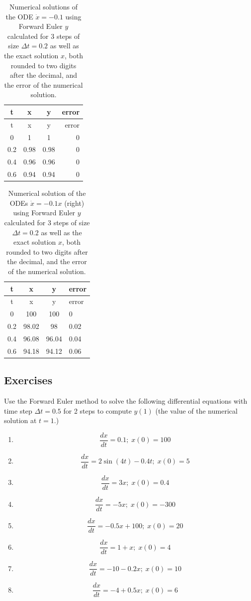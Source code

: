 \documentclass[
  letterpaper,
  DIV=11,
  numbers=noendperiod]{scrreprt}
\begin{document}
\begin{longtable}[]{@{}cccr@{}}
\caption{Numerical solutions of the ODE \(\dot x = -0.1\) using Forward
Euler \(y\) calculated for 3 steps of size \(\Delta t = 0.2\) as well as
the exact solution \(x\), both rounded to two digits after the decimal,
and the error of the numerical solution.}\tabularnewline
\toprule()
t & x & y & error \\
\midrule()
\endfirsthead
\toprule()
t & x & y & error \\
\midrule()
\endhead
0 & 1 & 1 & 0 \\
0.2 & 0.98 & 0.98 & 0 \\
0.4 & 0.96 & 0.96 & 0 \\
0.6 & 0.94 & 0.94 & 0 \\
\bottomrule()
\end{longtable}

\begin{longtable}[]{@{}cccl@{}}
\caption{Numerical solution of the ODEs \(\dot x = -0.1x\) (right) using
Forward Euler \(y\) calculated for 3 steps of size \(\Delta t = 0.2\) as
well as the exact solution \(x\), both rounded to two digits after the
decimal, and the error of the numerical solution.}\tabularnewline
\toprule()
t & x & y & error \\
\midrule()
\endfirsthead
\toprule()
t & x & y & error \\
\midrule()
\endhead
0 & 100 & 100 & 0 \\
0.2 & 98.02 & 98 & 0.02 \\
0.4 & 96.08 & 96.04 & 0.04 \\
0.6 & 94.18 & 94.12 & 0.06 \\
\bottomrule()
\end{longtable}

\label{tab:ch15_FE}

\hypertarget{exercises-24}{%
\subsection{Exercises}\label{exercises-24}}

Use the Forward Euler method to solve the following differential
equations with time step \(\Delta t=0.5\) for 2 steps to compute
\(y(1)\) (the value of the numerical solution at \(t=1\).)

\begin{enumerate}
\def\labelenumi{\arabic{enumi}.}
\item
  \[ \frac{dx}{dt} = 0.1; \; x(0)= 100 \]
\item
  \[ \frac{dx}{dt} =  2\sin(4t) -0.4t; \; x(0)= 5 \]
\item
  \[ \frac{dx}{dt} = 3x; \; x(0) = 0.4 \]
\item
  \[ \frac{dx}{dt} = -5x; \;  x(0) = -300 \]
\item
  \[ \frac{dx}{dt} = -0.5x + 100 ; \; x(0) = 20 \]
\item
  \[ \frac{dx}{dt} =  1 + x; \; x(0) = 4 \]
\item
  \[ \frac{dx}{dt} =  -10 - 0.2x; \; x(0) = 10 \]
\item
  \[ \frac{dx}{dt} =  -4 + 0.5x; \; x(0) = 6 \]
\end{enumerate}
\end{document}
